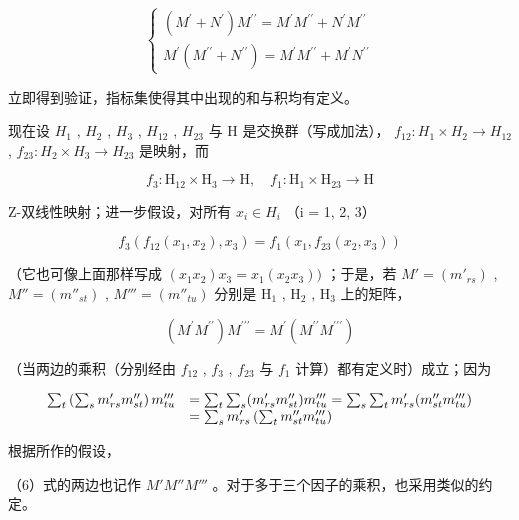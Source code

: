 \[
\left\{ \begin{array}{l} (M ^ {\prime} + N ^ {\prime}) M ^ {\prime \prime} = M ^ {\prime} M ^ {\prime \prime} + N ^ {\prime} M ^ {\prime \prime} \\ M ^ {\prime} (M ^ {\prime \prime} + N ^ {\prime \prime}) = M ^ {\prime} M ^ {\prime \prime} + M ^ {\prime} N ^ {\prime \prime} \end{array} \right.\tag{5}
\]

立即得到验证，指标集使得其中出现的和与积均有定义。

现在设 \(H_{1}\) , \(H_{2}\) , \(H_{3}\) , \(H_{12}\) , \(H_{23}\) 与 H 是交换群（写成加法）， \(f_{12}:H_{1} \times H_{2} \to H_{12}\) , \(f_{23}:H_{2} \times H_{3} \to H_{23}\) 是映射，而

\[
f _ {3}: \mathrm{H} _ {1 2} \times \mathrm{H} _ {3} \rightarrow \mathrm{H}, \quad f _ {1}: \mathrm{H} _ {1} \times \mathrm{H} _ {2 3} \rightarrow \mathrm{H}
\]

Z-双线性映射；进一步假设，对所有 \(x_{i} \in H_{i}\) （i = 1, 2, 3）

\[
f _ {3} (f _ {1 2} (x _ {1}, x _ {2}), x _ {3}) = f _ {1} (x _ {1}, f _ {2 3} (x _ {2}, x _ {3}))
\]

（它也可像上面那样写成 \((x_{1}x_{2})x_{3} = x_{1}(x_{2}x_{3}))\) ；于是，若 \(M' = (m'_{rs})\) , \(M'' = (m''_{st})\) , \(M''' = (m''_{tu})\) 分别是 \(\mathrm{H}_1\) , \(\mathrm{H}_2\) , \(\mathrm{H}_3\) 上的矩阵，

\[
(M ^ {\prime} M ^ {\prime \prime}) M ^ {\prime \prime \prime} = M ^ {\prime} (M ^ {\prime \prime} M ^ {\prime \prime \prime})\tag{6}
\]

（当两边的乘积（分别经由 \(f_{12}\) , \(f_{3}\) , \(f_{23}\) 与 \(f_{1}\) 计算）都有定义时）成立；因为

\[
\begin{array}{r l} \sum_ {t} \left(\sum_ {s} m _ {r s} ^ {\prime} m _ {s t} ^ {\prime \prime}\right) m _ {t u} ^ {\prime \prime \prime} & = \sum_ {t} \sum_ {s} (m _ {r s} ^ {\prime} m _ {s t} ^ {\prime \prime}) m _ {t u} ^ {\prime \prime \prime} = \sum_ {s} \sum_ {t} m _ {r s} ^ {\prime} (m _ {s t} ^ {\prime \prime} m _ {t u} ^ {\prime \prime \prime}) \\ & = \sum_ {s} m _ {r s} ^ {\prime} \left(\sum_ {t} m _ {s t} ^ {\prime \prime} m _ {t u} ^ {\prime \prime \prime}\right) \end{array}
\]

根据所作的假设，

（6）式的两边也记作 \(M'M''M'''\) 。对于多于三个因子的乘积，也采用类似的约定。

